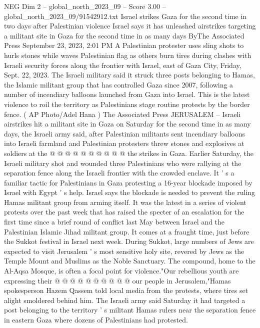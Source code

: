 \begin{textsample}{NEG Dim 2 – global\_north\_2023\_09 – Score 3.00 – global\_north\_2023\_09/91542912.txt}  \label{ex:f2_neg_074}
Israel strikes Gaza for the second time in two days after Palestinian violence Israel says it has unleashed airstrikes targeting a militant site in Gaza for the second time in as many days ByThe Associated Press September 23, 2023, 2:01 PM A Palestinian protester uses sling shots to hurls stones while waves Palestinian flag as others burn tires during clashes with Israeli security forces along the frontier with Israel, east of Gaza City, Friday, Sept. 22, 2023.
The Israeli military said it struck three posts belonging to Hamas, the Islamic militant group that has controlled Gaza since 2007, following a number of incendiary balloons launched from Gaza into Israel.
This is the latest violence to roil the territory as Palestinians stage routine protests by the border fence. ( AP Photo/Adel Hana ) The Associated Press JERUSALEM -- Israeli airstrikes hit a militant site in Gaza on Saturday for the second time in as many days, the Israeli army said, after Palestinian militants sent incendiary balloons into Israeli farmland and Palestinian protesters threw stones and explosives at soldiers at the @ @ @ @ @ @ @ @ @ @ the strikes in Gaza.
Earlier Saturday, the Israeli military shot and wounded three Palestinians who were rallying at the separation fence along the Israeli frontier with the crowded enclave.
It ' s a familiar tactic for Palestinians in Gaza protesting a 16-year blockade imposed by Israel with Egypt ' s help.
Israel says the blockade is needed to prevent the ruling Hamas militant group from arming itself.
It was the latest in a series of violent protests over the past week that has raised the specter of an escalation for the first time since a brief round of conflict last May between Israel and the Palestinian Islamic Jihad militant group.
It comes at a fraught time, just before the Sukkot festival in Israel next week.
During Sukkot, large numbers of Jews are expected to visit Jerusalem ' s most sensitive holy site, revered by Jews as the Temple Mount and Muslims as the Noble Sanctuary.
The compound, home to the Al-Aqsa Mosque, is often a focal point for violence."Our rebellious youth are expressing their @ @ @ @ @ @ @ @ @ @ our people in Jerusalem,"Hamas spokesperson Hazem Qassem told local media from the protests, where tires set alight smoldered behind him.
The Israeli army said Saturday it had targeted a post belonging to the territory ' s militant Hamas rulers near the separation fence in eastern Gaza where dozens of Palestinians had protested.

\end{textsample}
